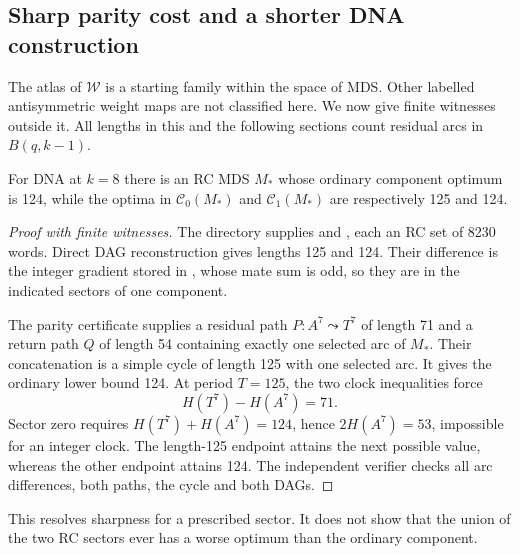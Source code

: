 \subsection{Sharp parity cost and a shorter DNA construction}
\label{sec:construction-107}
The atlas of $\mathcal W$ is a starting family within the space of MDS. Other labelled antisymmetric weight maps are not classified here.
We now give finite witnesses outside it. All lengths in this and the
following sections count residual arcs in $B(q,k-1)$.

\begin{proposition}
\label{prop:sharp-parity}
For DNA at $k=8$ there is an RC MDS $M_*$ whose ordinary component
optimum is 124, while the optima in $\mathcal C_0(M_*)$ and
$\mathcal C_1(M_*)$ are respectively 125 and 124.
\end{proposition}
\begin{proof}[Proof with finite witnesses]
The directory  supplies
 and ,
each an RC set of 8230 words.
Direct DAG reconstruction gives lengths 125 and 124. Their difference
is the integer gradient stored in
, whose mate
sum is odd, so they are in the indicated sectors of one component.

The parity certificate supplies a residual path $P:A^7\leadsto T^7$
of length 71 and a return path $Q$ of length 54 containing exactly
one selected arc of $M_*$. Their concatenation is a simple cycle
of length 125 with one selected arc. It gives the ordinary lower
bound 124. At period $T=125$, the two clock inequalities force
\[
 H(T^7)-H(A^7)=71.
\]
Sector zero requires $H(T^7)+H(A^7)=124$, hence
$2H(A^7)=53$, impossible for an integer clock. The length-125
endpoint attains the next possible value, whereas the other endpoint
attains 124. The independent verifier checks all arc differences,
both paths, the cycle and both DAGs.
\end{proof}
This resolves sharpness for a prescribed sector. It does not show that
the union of the two RC sectors ever has a worse optimum than the
ordinary component.

